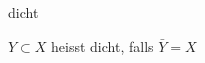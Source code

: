 \documentclass[class=article, crop=false]{standalone}
\begin{document}
\begin{zettel}{dicht}
\begin{flashcard}
    \begin{definition}[dicht]
        $Y \subset X$ heisst dicht, falls $ \bar{Y} = X$ 
    \end{definition}
\end{flashcard}
\end{zettel}
\end{document}
